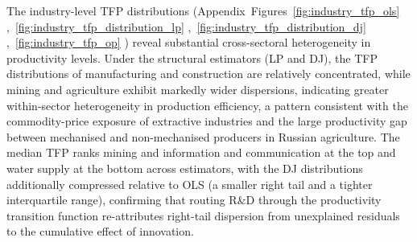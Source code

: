 \documentclass[a4paper, 12pt]{article}
\begin{document}
The industry-level TFP distributions (Appendix~Figures~\ref{fig:industry_tfp_ols} \hypertarget{target:industry_tfp_ols}{},~\ref{fig:industry_tfp_distribution_lp} \hypertarget{target:industry_tfp_distribution_lp}{},~\ref{fig:industry_tfp_distribution_dj} \hypertarget{target:industry_tfp_distribution_dj}{},~\ref{fig:industry_tfp_op} \hypertarget{target:industry_tfp_op}{}) reveal substantial cross-sectoral heterogeneity in productivity levels. Under the structural estimators (LP and DJ), the TFP distributions of manufacturing and construction are relatively concentrated, while mining and agriculture exhibit markedly wider dispersions, indicating greater within-sector heterogeneity in production efficiency, a pattern consistent with the commodity-price exposure of extractive industries and the large productivity gap between mechanised and non-mechanised producers in Russian agriculture. The median TFP ranks mining and information and communication at the top and water supply at the bottom across estimators, with the DJ distributions additionally compressed relative to OLS (a smaller right tail and a tighter interquartile range), confirming that routing R\&D through the productivity transition function re-attributes right-tail dispersion from unexplained residuals to the cumulative effect of innovation.
\end{document}
